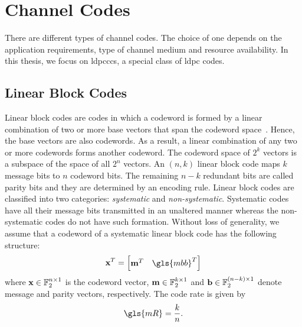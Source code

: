 \section{Channel Codes}
There are different types of channel codes. The choice of one depends on the application requirements, type of channel medium and resource availability. In this thesis, we focus on \glspl{ldpccc}, a special class of \gls{ldpc} codes.
\subsection{Linear Block Codes}
Linear block codes are codes in which a codeword is formed by a linear combination of two or more base vectors that span the codeword space~\cite{proak}. Hence, the base vectors are also codewords. As a result, a linear combination of any two or more codewords forms another codeword. The codeword space of $2^k$ vectors is a subspace of the space of all $2^n$ vectors. An $(n,k)$ linear block code maps $k$ message bits to $n$ codeword bits. The remaining $n-k$ redundant bits are called parity bits and they are determined by an encoding rule. Linear block codes are classified into two categories: \emph{systematic} and \emph{non-systematic}. Systematic codes have all their message bits transmitted in an unaltered manner whereas the non-systematic codes do not have such formation. Without loss of generality, we assume that a codeword of a systematic linear block code has the following structure: 
\begin{align}
\x^T=
\begin{bmatrix}
\m^T &\gls{mbb}^T
\end{bmatrix}
\end{align}
where $\mathbf{x}\in\mathbb{F}_2^{n\times 1}$ is the codeword vector, $\mathbf{m}\in\mathbb{F}_2^{k\times 1}$ and $\mathbf{b}\in\mathbb{F}_2^{(n-k)\times 1}$ denote message and parity vectors, respectively. The code rate is given by \begin{align}\gls{mR}=\frac{k}{n}.\end{align}

